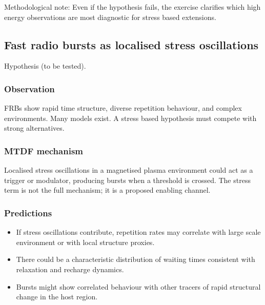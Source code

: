 \documentclass[11pt,a4paper]{article}
\begin{document}
\begin{mdframed}[linecolor=accent,linewidth=0.5pt,backgroundcolor=callout-bg,leftline=true,rightline=true,topline=true,bottomline=true,innerleftmargin=8pt,innerrightmargin=8pt,innertopmargin=6pt,innerbottommargin=6pt]
Methodological note: Even if the hypothesis fails, the exercise clarifies which high energy observations are most diagnostic for stress based extensions.
\end{mdframed}

\subsection{Fast radio bursts as localised stress oscillations}
\begin{mdframed}[linecolor=accent,linewidth=0.5pt,backgroundcolor=callout-bg,leftline=true,rightline=true,topline=true,bottomline=true,innerleftmargin=8pt,innerrightmargin=8pt,innertopmargin=6pt,innerbottommargin=6pt]
Hypothesis (to be tested).
\end{mdframed}

\subsubsection{Observation}
FRBs show rapid time structure, diverse repetition behaviour, and complex environments. Many models exist. A stress based hypothesis must compete with strong alternatives.

\subsubsection{MTDF mechanism}
Localised stress oscillations in a magnetised plasma environment could act as a trigger or modulator, producing bursts when a threshold is crossed. The stress term is not the full mechanism; it is a proposed enabling channel.

\subsubsection{Predictions}
\begin{itemize}
  \item If stress oscillations contribute, repetition rates may correlate with large scale environment or with local structure proxies.
  \item There could be a characteristic distribution of waiting times consistent with relaxation and recharge dynamics.
  \item Bursts might show correlated behaviour with other tracers of rapid structural change in the host region.
\end{itemize}
\end{document}
